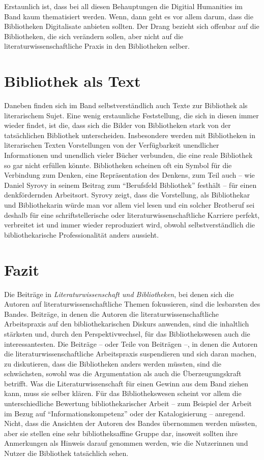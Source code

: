 \documentclass[a4paper,
fontsize=11pt,
oneside,
numbers=noperiodatend,
parskip=half-,
bibliography=totoc,
final
]{scrartcl}
\begin{document}
Erstaunlich ist, dass bei all diesen Behauptungen die Digitial
Humanities im Band kaum thematisiert werden. Wenn, dann geht es vor
allem darum, dass die Bibliotheken Digitalisate anbieten sollten. Der
Drang bezieht sich offenbar auf die Bibliotheken, die sich verändern
sollen, aber nicht auf die literaturwissenschaftliche Praxis in den
Bibliotheken selber.

\section*{Bibliothek als Text}\label{bibliothek-als-text}

Daneben finden sich im Band selbstverständlich auch Texte zur Bibliothek
als literarischem Sujet. Eine wenig erstaunliche Feststellung, die sich
in diesen immer wieder findet, ist die, dass sich die Bilder von
Bibliotheken stark von der tatsächlichen Bibliothek unterscheiden.
Insbesondere werden mit Bibliotheken in literarischen Texten
Vorstellungen von der Verfügbarkeit unendlicher Informationen und
unendlich vieler Bücher verbunden, die eine reale Bibliothek so gar
nicht erfüllen könnte. Bibliotheken scheinen oft ein Symbol für die
Verbindung zum Denken, eine Repräsentation des Denkens, zum Teil auch --
wie Daniel Syrovy in seinem Beitrag zum \enquote{Berufsfeld Bibliothek}
festhält -- für einen denkfördernden Arbeitsort. Syrovy zeigt, dass die
Vorstellung, als Bibliothekar und Bibliothekarin würde man vor allem
viel lesen und ein solcher Brotberuf sei deshalb für eine
schriftstellerische oder literaturwissenschaftliche Karriere perfekt,
verbreitet ist und immer wieder reproduziert wird, obwohl
selbstverständlich die bibliothekarische Professionalität anders
aussieht.

\section*{Fazit}\label{fazit}

Die Beiträge in \emph{Literaturwissenschaft und Bibliotheken}, bei denen
sich die Autoren auf literaturwissenschaftliche Themen fokussieren, sind
die lesbarsten des Bandes. Beiträge, in denen die Autoren die
literaturwissenschaftliche Arbeitspraxis auf den bibliothekarischen
Diskurs anwenden, sind die inhaltlich stärksten und, durch den
Perspektivwechsel, für das Bibliothekswesen auch die interessantesten.
Die Beiträge -- oder Teile von Beiträgen --, in denen die Autoren die
literaturwissenschaftliche Arbeitspraxis suspendieren und sich daran
machen, zu diskutieren, dass die Bibliotheken anders werden müssten,
sind die schwächsten, sowohl was die Argumentation als auch die
Überzeugungskraft betrifft. Was die Literaturwissenschaft für einen
Gewinn aus dem Band ziehen kann, muss sie selber klären. Für das
Bibliothekswesen scheint vor allem die unterschiedliche Bewertung
bibliothekarischer Arbeit -- zum Beispiel der Arbeit im Bezug auf
\enquote{Informationskompetenz} oder der Katalogisierung -- anregend.
Nicht, dass die Ansichten der Autoren des Bandes übernommen werden
müssten, aber sie stellen eine sehr bibliotheksaffine Gruppe dar,
insoweit sollten ihre Anmerkungen als Hinweis darauf genommen werden,
wie die Nutzerinnen und Nutzer die Bibliothek tatsächlich sehen.
\end{document}
